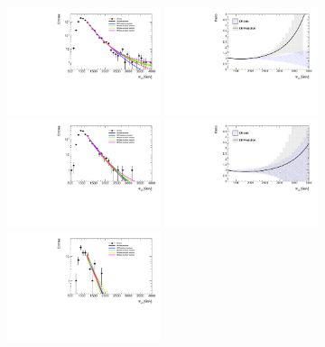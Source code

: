 \begin{figure}[htbp!]
\begin{center}
\includegraphics[width=0.4\textwidth,angle=-90]{figures/boosted/Syst_Shape/QCDSysfitSmooth_22.pdf}
\includegraphics[width=0.4\textwidth,angle=-90]{figures/boosted/Syst_Shape/QCDSysfitSmooth_ratio_22.pdf} \\
\includegraphics[width=0.4\textwidth,angle=-90]{figures/boosted/Syst_Shape/QCDSysfitSmooth_33.pdf}
\includegraphics[width=0.4\textwidth,angle=-90]{figures/boosted/Syst_Shape/QCDSysfitSmooth_ratio_33.pdf} \\
\includegraphics[width=0.4\textwidth,angle=-90]{figures/boosted/Syst_Shape/QCDSysfitSmooth_44.pdf}

\end{center}
\end{figure}
